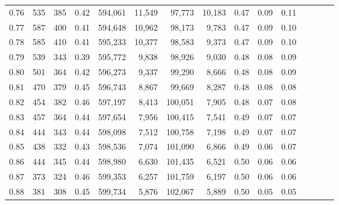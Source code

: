 \begin{tabular}{rrrcrrrrrrrrrrr}
0.76 &     535 &    385 &                                       0.42 &  594,061 &   11,549 &   97,773 &   10,183 &  0.47 &  0.09 &                         0.11 \\
0.77 &     587 &    400 &                                       0.41 &  594,648 &   10,962 &   98,173 &    9,783 &  0.47 &  0.09 &                         0.10 \\
0.78 &     585 &    410 &                                       0.41 &  595,233 &   10,377 &   98,583 &    9,373 &  0.47 &  0.09 &                         0.10 \\
0.79 &     539 &    343 &                                       0.39 &  595,772 &    9,838 &   98,926 &    9,030 &  0.48 &  0.08 &                         0.09 \\
0.80 &     501 &    364 &                                       0.42 &  596,273 &    9,337 &   99,290 &    8,666 &  0.48 &  0.08 &                         0.09 \\
0.81 &     470 &    379 &                                       0.45 &  596,743 &    8,867 &   99,669 &    8,287 &  0.48 &  0.08 &                         0.08 \\
0.82 &     454 &    382 &                                       0.46 &  597,197 &    8,413 &  100,051 &    7,905 &  0.48 &  0.07 &                         0.08 \\
0.83 &     457 &    364 &                                       0.44 &  597,654 &    7,956 &  100,415 &    7,541 &  0.49 &  0.07 &                         0.07 \\
0.84 &     444 &    343 &                                       0.44 &  598,098 &    7,512 &  100,758 &    7,198 &  0.49 &  0.07 &                         0.07 \\
0.85 &     438 &    332 &                                       0.43 &  598,536 &    7,074 &  101,090 &    6,866 &  0.49 &  0.06 &                         0.07 \\
0.86 &     444 &    345 &                                       0.44 &  598,980 &    6,630 &  101,435 &    6,521 &  0.50 &  0.06 &                         0.06 \\
0.87 &     373 &    324 &                                       0.46 &  599,353 &    6,257 &  101,759 &    6,197 &  0.50 &  0.06 &                         0.06 \\
0.88 &     381 &    308 &                                       0.45 &  599,734 &    5,876 &  102,067 &    5,889 &  0.50 &  0.05 &                         0.05 \\

\end{tabular}
